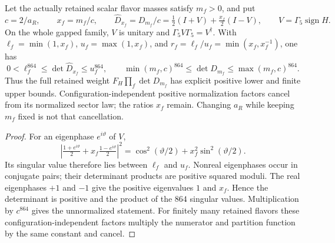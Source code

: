 \documentclass[12pt,a4paper]{article}
\begin{document}
\begin{theorem}
\label{p10:thm:v2189-whole-vectorlike-determinant-bounds}
Let the actually retained scalar flavor masses satisfy $m_f>0$, and put
\[
 c=2/a_R,\qquad x_f=m_f/c,\qquad
 \widehat D_{x_f}=D_{m_f}/c
 =\tfrac12(I+V)+\tfrac{x_f}{2}(I-V),\qquad
 V=\Gamma_5\operatorname{sign}H.
\]
On the whole gapped family, $V$ is unitary and
$\Gamma_5V\Gamma_5=V^\dagger$. With
$\ell_f=\min(1,x_f)$, $u_f=\max(1,x_f)$, and
$r_f=\ell_f/u_f=\min(x_f,x_f^{-1})$, one has
\[
 0<\ell_f^{864}\le\det\widehat D_{x_f}\le u_f^{864},
 \qquad
 \min(m_f,c)^{864}\le\det D_{m_f}\le\max(m_f,c)^{864}.
\]
Thus the full retained weight $F_H\prod_f\det D_{m_f}$ has explicit
positive lower and finite upper bounds. Configuration-independent positive
normalization factors cancel from its normalized sector law; the ratios
$x_f$ remain. Changing $a_R$ while keeping $m_f$ fixed is not that cancellation.
\end{theorem}
\begin{proof}
For an eigenphase $e^{i\vartheta}$ of $V$,
\[
 \left|\tfrac{1+e^{i\vartheta}}2
       +x_f\tfrac{1-e^{i\vartheta}}2\right|^2
 =\cos^2(\vartheta/2)+x_f^2\sin^2(\vartheta/2).
\]
Its singular value therefore lies between $\ell_f$ and $u_f$.
Nonreal eigenphases occur in conjugate pairs; their determinant products
are positive squared moduli. The real eigenphases $+1$ and $-1$ give the
positive eigenvalues $1$ and $x_f$. Hence the determinant is positive and
the product of the $864$ singular values. Multiplication by $c^{864}$
gives the unnormalized statement. For finitely many retained flavors these
configuration-independent factors multiply the numerator and partition
function by the same constant and cancel.
\end{proof}
\end{document}
